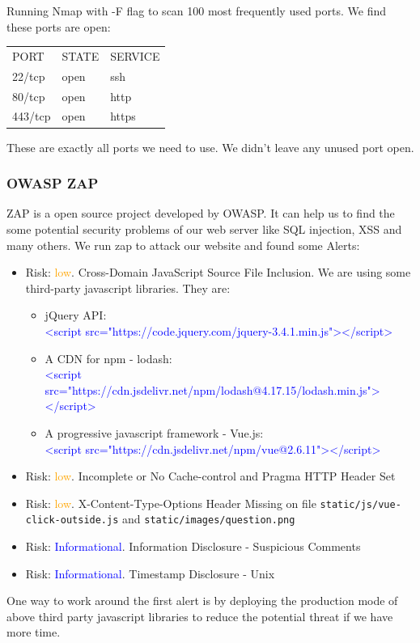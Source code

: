 \documentclass[12pt, a4paper]{article}
\newcommand{\code}[1]{\texttt{#1}}
\begin{document}
Running Nmap with -F flag to scan 100 most frequently used ports.
We find these ports are open:
\begin{center}
    \begin{tabular}{l l l}
        PORT & STATE & SERVICE \\
        22/tcp & open & ssh\\
        80/tcp & open & http\\
        443/tcp & open & https
    \end{tabular}
\end{center}
These are exactly all ports we need to use. We didn't leave any unused port open.

\subsubsection{OWASP ZAP}
ZAP is a open source project developed by OWASP. It can help us to find the some potential security problems of our web server like SQL injection, XSS and many others.
We run zap to attack our website and found some Alerts:
\begin{itemize}
    \item Risk: \textcolor{orange}{low}. Cross-Domain JavaScript Source File Inclusion. We are using some third-party javascript libraries. They are:
    \begin{itemize}
        \item jQuery API:\\ \textcolor{blue}{<script src="https://code.jquery.com/jquery-3.4.1.min.js"></script>}
        \item A CDN for npm - lodash:\\ \textcolor{blue}{<script src="https://cdn.jsdelivr.net/npm/lodash@4.17.15/lodash.min.js"></script>}
        \item A progressive javascript framework - Vue.js:\\ \textcolor{blue}{<script src="https://cdn.jsdelivr.net/npm/vue@2.6.11"></script>}
    \end{itemize}
    \item Risk: \textcolor{orange}{low}. Incomplete or No Cache-control and Pragma HTTP Header Set
    \item Risk: \textcolor{orange}{low}. X-Content-Type-Options Header Missing on file \code{static/js/vue-click-outside.js} and \code{static/images/question.png}
    \item Risk: \textcolor{blue}{Informational}. Information Disclosure - Suspicious Comments
    \item Risk: \textcolor{blue}{Informational}. Timestamp Disclosure - Unix
\end{itemize}
One way to work around the first alert is by deploying the production mode of above third party javascript libraries to reduce the potential threat if we have more time.
\end{document}
